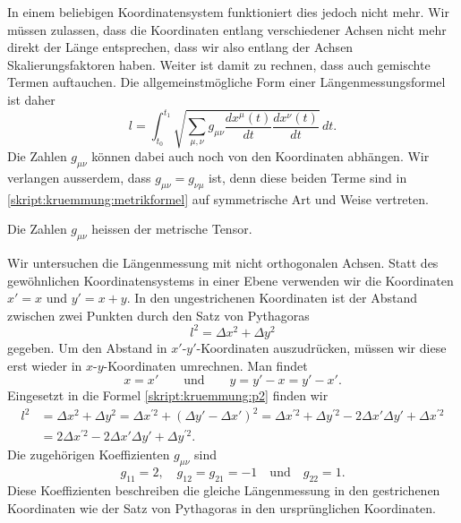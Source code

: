 In einem beliebigen Koordinatensystem funktioniert dies jedoch nicht
mehr.
Wir müssen zulassen, dass die Koordinaten entlang verschiedener
Achsen nicht mehr direkt der Länge entsprechen, dass wir also
entlang der Achsen Skalierungsfaktoren haben.
Weiter ist damit zu rechnen, dass auch gemischte Termen auftauchen.
Die allgemeinstmögliche Form einer Längenmessungsformel ist daher
\begin{equation}
l
=
\int_{t_0}^{t_1}
\sqrt{\sum_{\mu,\nu} g_{\mu\nu} \frac{dx^{\mu}(t)}{dt}\frac{dx^{\nu}(t)}{dt}}\,dt.
\label{skript:kruemmung:metrikformel}
\end{equation}
Die Zahlen $g_{\mu\nu}$ können dabei auch noch von den Koordinaten
abhängen.
Wir verlangen ausserdem, dass $g_{\mu\nu}=g_{\nu\mu}$ ist, denn
diese beiden Terme sind in \eqref{skript:kruemmung:metrikformel}
auf symmetrische Art und Weise vertreten.

\begin{definition}
Die Zahlen $g_{\mu\nu}$ heissen der metrische Tensor.
\end{definition}

%
%
\begin{beispiel}
Wir untersuchen die Längenmessung mit nicht orthogonalen Achsen.
Statt des gewöhnlichen Koordinatensystems in einer Ebene verwenden
wir die Koordinaten $x'=x$ und $y'=x+y$.
In den ungestrichenen Koordinaten ist der Abstand zwischen zwei
Punkten durch den Satz von Pythagoras
\begin{equation}
l^2 = \Delta x^2 + \Delta y^2
\label{skript:kruemmung:p2}
\end{equation}
gegeben.
Um den Abstand in $x'$-$y'$-Koordinaten auszudrücken, müssen wir diese
erst wieder in $x$-$y$-Koordinaten umrechnen. 
Man findet
\[
x=x'
\qquad\text{und}\qquad
y=y'-x=y'-x'.
\]
Eingesetzt in die Formel \eqref{skript:kruemmung:p2} finden wir
\begin{align*}
l^2
&=
\Delta x^2 + \Delta y^2
=
\Delta x^{\prime 2}
+
(\Delta y'- \Delta x')^2
=
\Delta x^{\prime 2}
+
\Delta y^{\prime 2}-2\Delta x'\Delta y' + \Delta x^{\prime 2}
\\
&= 2 \Delta x^{\prime 2} - 2 \Delta x'\Delta y'+\Delta y^{\prime 2}.
\end{align*}
Die zugehörigen Koeffizienten $g_{\mu\nu}$ sind
\[
g_{11} = 2,\quad
g_{12}=g_{21}=-1\quad\text{und}\quad
g_{22}=1.
\]
Diese Koeffizienten beschreiben die gleiche Längenmessung in den 
gestrichenen Koordinaten wie der Satz von Pythagoras in den ursprünglichen
Koordinaten.
\end{beispiel}


